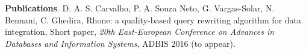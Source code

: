 \documentclass[11pt,a4paper,oneside]{report}
\begin{document}

\noindent
\textbf{Publications}.
D. A. S. Carvalho, P. A. Souza Neto, G. Vargas-Solar, N. Bennani, C. Ghedira, Rhone: a quality-based query rewriting algorithm for data integration, Short paper, {\em 20th East-European Conference on Advances in Databases and Information Systems}, ADBIS 2016 (to appear).



\end{document}
